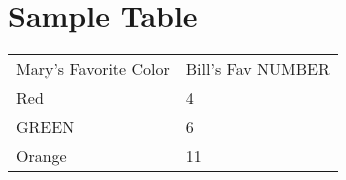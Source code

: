 \newpage
\section * {Sample Table}

\begin{tabular}{| L | L |}
\hline
 Mary's Favorite Color & Bill's Fav NUMBER   \\ 
 Red & 4   \\  
 \hline
 GREEN & 6  \\
 \hline
  Orange & 11  \\
 \hline  
\end{tabular}


